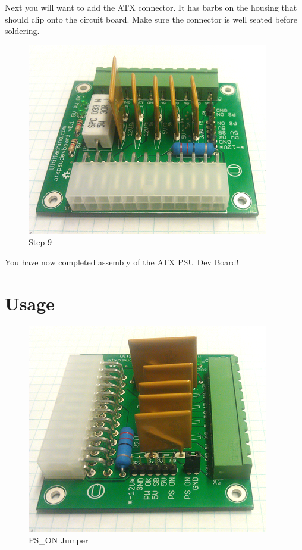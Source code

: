 Next you will want to add the ATX connector. It has barbs on the housing
that should clip onto the circuit board. Make sure the connector is well
seated before soldering.

\begin{figure}[htbp]
\centering
\includegraphics{./png/step-09.png}
\caption{Step 9}
\end{figure}

You have now completed assembly of the ATX PSU Dev Board!

\section{Usage}

\begin{figure}[htbp]
\centering
\includegraphics{./png/step-10.png}
\caption{PS\_ON Jumper}
\end{figure}

